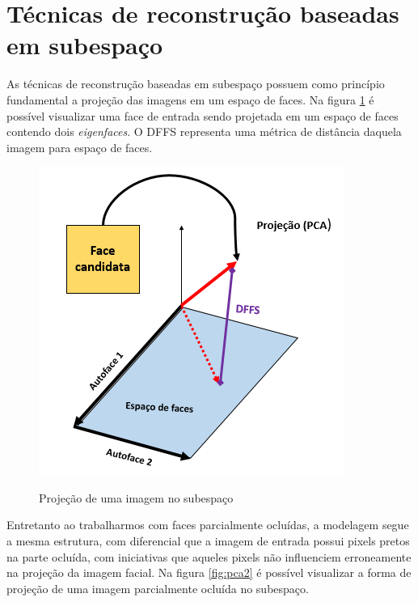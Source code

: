 \section{Técnicas de reconstrução baseadas em subespaço}


As técnicas de reconstrução baseadas em subespaço possuem como princípio fundamental a projeção das imagens em um espaço de faces. Na figura \ref{fig:pca1} é possível visualizar uma face de entrada sendo projetada em um espaço de faces contendo dois \textit{eigenfaces}. O DFFS representa uma métrica de distância daquela imagem para espaço de faces.



\begin{figure}[H]
\centering
\caption{Projeção de uma imagem no subespaço}
\includegraphics[scale = 0.75]{imgs/pca1.png}
\label{fig:pca1}
\end{figure}

Entretanto ao trabalharmos com faces parcialmente ocluídas, a modelagem segue a mesma estrutura, com diferencial que a imagem de entrada possui pixels pretos na parte ocluída, com iniciativas que aqueles pixels não influenciem erroneamente na projeção da imagem facial. Na figura \ref{fig:pca2} é possível visualizar a forma de projeção de uma imagem parcialmente ocluída no subespaço.

